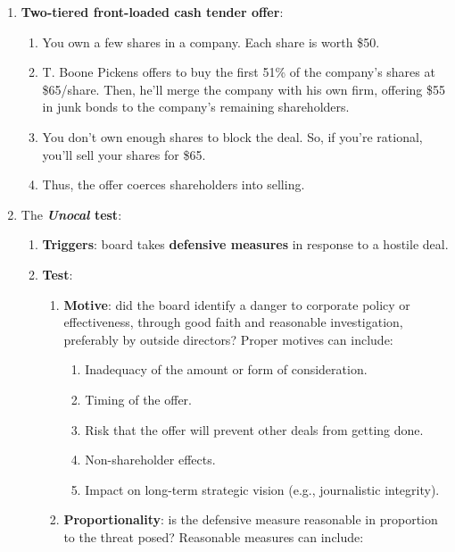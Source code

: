 \begin{enumerate}
    \item \textbf{Two-tiered front-loaded cash tender offer}:
    \begin{enumerate}
        \item You own a few shares in a company. Each share is worth \$50.
        \item T. Boone Pickens offers to buy the first 51\% of the company's 
        shares at \$65/share. Then, he'll merge the company with his own firm, 
        offering \$55 in junk bonds to the company's remaining shareholders.
        \item You don't own enough shares to block the deal. So, if you're 
        rational, you'll sell your shares for \$65.
        \item Thus, the offer coerces shareholders into selling.
    \end{enumerate}
    \item The \textbf{\emph{Unocal} test}:
    \begin{enumerate}
        \item \textbf{Triggers}: board takes \textbf{defensive measures} in 
        response to a hostile deal.
        \item \textbf{Test}:
        \begin{enumerate}
            \item \textbf{Motive}: did the board identify a danger to 
            corporate policy or effectiveness, through good faith and 
            reasonable investigation, preferably by outside directors? Proper 
            motives can include:
            \begin{enumerate}
                \item Inadequacy of the amount or form of consideration.
                \item Timing of the offer.
                \item Risk that the offer will prevent other deals from 
                getting done.
                \item Non-shareholder effects.
                \item Impact on long-term strategic vision (e.g., journalistic 
                integrity).
            \end{enumerate}
            \item \textbf{Proportionality}: is the defensive measure 
            reasonable in proportion to the threat posed? Reasonable measures 
            can include:
            \begin{enumerate}

\end{enumerate}
\end{enumerate}
\end{enumerate}
\end{enumerate}
